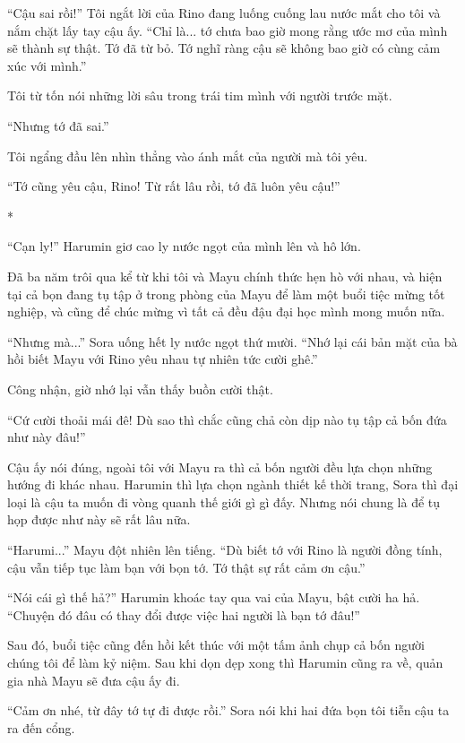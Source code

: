 {    ``Cậu sai rồi!'' Tôi ngắt lời của Rino đang luống cuống lau nước mắt cho
    tôi và nắm chặt lấy tay cậu ấy. ``Chỉ là... tớ chưa bao giờ mong rằng
    ước mơ của mình sẽ thành sự thật. Tớ đã từ bỏ. Tớ nghĩ ràng cậu sẽ không
    bao giờ có cùng cảm xúc với mình.''

    Tôi từ tốn nói những lời sâu trong trái tim mình với người trước mặt.

    ``Nhưng tớ đã sai.''

    Tôi ngẩng đầu lên nhìn thẳng vào ánh mắt của người mà tôi yêu.

    ``Tớ cũng yêu cậu, Rino! Từ rất lâu rồi, tớ đã luôn yêu cậu!''

    *

    ``Cạn ly!'' Harumin giơ cao ly nước ngọt của mình lên và hô lớn.

    Đã ba năm trôi qua kể từ khi tôi và Mayu chính thức hẹn hò với nhau, và
    hiện tại cả bọn đang tụ tập ở trong phòng của Mayu để làm một buổi tiệc
    mừng tốt nghiệp, và cũng để chúc mừng vì tất cả đều đậu đại học mình
    mong muốn nữa.

    ``Nhưng mà...'' Sora uống hết ly nước ngọt thứ mười. ``Nhớ lại cái bản
    mặt của bà hồi biết Mayu với Rino yêu nhau tự nhiên tức cười ghê.''

    Công nhận, giờ nhớ lại vẫn thấy buồn cười thật.

    ``Cứ cười thoải mái đê! Dù sao thì chắc cũng chả còn dịp nào tụ tập cả
    bốn đứa như này đâu!''

    Cậu ấy nói đúng, ngoài tôi với Mayu ra thì cả bốn người đều lựa chọn
    những hướng đi khác nhau. Harumin thì lựa chọn ngành thiết kế thời
    trang, Sora thì đại loại là cậu ta muốn đi vòng quanh thế giới gì gì
    đấy. Nhưng nói chung là để tụ họp được như này sẽ rất lâu nữa.

    ``Harumi...'' Mayu đột nhiên lên tiếng. ``Dù biết tớ với Rino là người
    đồng tính, cậu vẫn tiếp tục làm bạn với bọn tớ. Tớ thật sự rất cảm ơn
    cậu.''

    ``Nói cái gì thế hả?'' Harumin khoác tay qua vai của Mayu, bật cười ha
    hả. ``Chuyện đó đâu có thay đổi được việc hai người là bạn tớ đâu!''

    Sau đó, buổi tiệc cũng đến hồi kết thúc với một tấm ảnh chụp cả bốn
    người chúng tôi để làm kỷ niệm. Sau khi dọn dẹp xong thì Harumin cũng ra
    về, quản gia nhà Mayu sẽ đưa cậu ấy đi.

    ``Cảm ơn nhé, từ đây tớ tự đi được rồi.'' Sora nói khi hai đứa bọn tôi
    tiễn cậu ta ra đến cổng.

}
